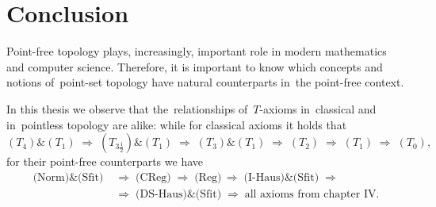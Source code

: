 \chapter*{Conclusion}

Point-free topology plays, increasingly, important role in modern mathematics
and computer science.
Therefore, it is important to know which concepts and notions of~point-set
topology have natural counterparts in~the point-free context.

In this thesis we observe that the~relationships of~$T$-axioms in~classical and
in~pointless topology are alike:
while for classical axioms it holds that
\[
  (T_4) \& (T_1)
  \; \Longrightarrow \; (T_{3\frac{1}{2}}) \& (T_1)
  \; \Longrightarrow \; (T_3) \& (T_1)
  \; \Longrightarrow \; (T_2)
  \; \Longrightarrow \; (T_1)
  \; \Longrightarrow \; (T_0),
\]
for their point-free counterparts we have
\begin{align*}
  \text{(Norm)} \& \text{(Sfit)}
  \; &\Rightarrow \; \text{(CReg)}
  \; \Rightarrow \; \text{(Reg)}
  \, \Rightarrow \; \text{(I-Haus)} \& \text{(Sfit)}
  \; \Rightarrow \\
  \; &\Rightarrow \; \text{(DS-Haus)} \& \text{(Sfit)}
  \; \Rightarrow \; \text{all axioms from chapter IV}.
\end{align*}
